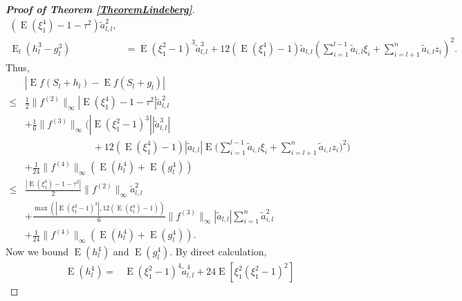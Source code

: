 \documentclass[smallextended]{svjour3}       %
\DeclareMathOperator{\myE}{E}
\begin{document}
\begin{proof}[\textbf{Proof of Theorem \ref{TheoremLindeberg}}]
\begin{equation*}
\begin{split}
        \left(
            \myE (\xi_1^4) - 1
            -
            \tau^2
        \right)
        \tilde a_{l,l}^2
        ,
        \\
        \myE_l (h_l^3-g_l^3)&= 
        \myE (\xi_1^2-1)^3
        \tilde a_{l,l}^3 
        +
        12 (\myE (\xi_1^4) - 1) \tilde a_{l,l} \left( \sum_{i=1}^{l-1} \tilde a_{i,l} \xi_i + \sum_{i=l+1}^n \tilde a_{i,l} z_i    \right)^2 
        .
    \end{split}
\end{equation*}
Thus,
\begin{equation}\label{eq:Lin1}
        \begin{split}
             &\left| \myE f(S_{l}+h_{l})-\myE f(S_{l}+g_{l})\right|
             \\
\leq&
\frac{1}{2}
\|f^{(2)}\|_\infty
\left|
\myE(\xi_1^4)-1
            -\tau^2
\right|
        \tilde a_{l,l}^2
        \\
            &+
            \frac{1}{6} \|f^{(3)}\|_{\infty}
\Bigg(
    \left|\myE (\xi_1^2-1)^3\right|
        |\tilde a_{l,l}^3 |
        \\
        &\quad\quad\quad\quad\quad\quad\quad+
        12 (\myE (\xi_1^4)-1) |\tilde a_{l,l}|
            \myE 
            \bigg( \sum_{i=1}^{l-1} \tilde a_{i,l} \xi_i + \sum_{i=l+1}^n \tilde a_{i,l} z_i    \bigg)^2 
    \Bigg)
    \\
            &+
            \frac{1}{24} \|f^{(4)} \|_{\infty} \left(\myE (h_{l}^4)+\myE (g_{l}^4)\right)
            \\
\leq &
\frac{
\left|
\myE (\xi_1^4)-1
            -
            \tau^2
\right|
}{2}
\|f^{(2)}\|_\infty
        \tilde a_{l,l}^2
        \\
            &+
            \frac{
            \max\left(
    \left|\myE (\xi_1^2-1)^3\right|
            ,
12 (\myE (\xi_1^4)-1)
        \right)
            }{6} \|f^{(3)}\|_\infty
|\tilde a_{l,l}|
         \sum_{i=1}^{n} \tilde a_{i,l}^2 
         \\
            &+
            \frac{1}{24} \|f^{(4)} \|_{\infty} \left(\myE (h_{l}^4)+\myE (g_{l}^4)\right)
            .
        \end{split}
    \end{equation}
    Now we bound $\myE (h_l^4)$ and $\myE (g_l^4)$.
    By direct calculation,
\begin{equation*}
    \begin{split}
        \myE (h_l^4)
        =&
        \myE (\xi_1^2 - 1)^4 \tilde a_{l,l}^4
        + 24 \myE [ \xi_1^2(\xi_1^2 -1)^2]

\end{split}
\end{equation*}
\end{proof}
\end{document}
